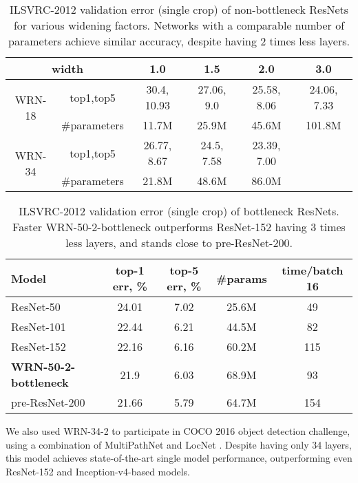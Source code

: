 \documentclass{bmvc2k}
\begin{document}
\begin{table}[ht]
  \centering\small
  \begin{tabular}{c|c|c|c|c|c}
    \hline
\multicolumn{2}{c|}{width} & 1.0 & 1.5 & 2.0 & 3.0 \\ \hline
    \multirow{2}{*}{WRN-18} & top1,top5 & 30.4, 10.93 & 27.06, 9.0 & 25.58, 8.06 & 24.06, 7.33 \\
    & \#parameters & 11.7M & 25.9M & 45.6M & 101.8M \\
    \hline
    \multirow{2}{*}{WRN-34} & top1,top5 & 26.77, 8.67 & 24.5, 7.58 & 23.39, 7.00 &  \\
    & \#parameters & 21.8M & 48.6M & 86.0M \\
    \hline
  \end{tabular}
  \caption{ILSVRC-2012 validation error (single crop) of non-bottleneck ResNets for various widening factors. Networks with a comparable number of parameters achieve similar accuracy, despite having 2 times less layers.}
  \label{table:imagenet_non_bottleneck}
\end{table}

\begin{table}[ht]
  \centering\small
  \begin{tabular}{l|c|c|c|c}
    \hline
    Model & top-1 err, \% & top-5 err, \% & \#params & time/batch 16 \\ \hline
    ResNet-50 & 24.01 & 7.02 & 25.6M & 49 \\
    ResNet-101 & 22.44 & 6.21 & 44.5M & 82 \\
    ResNet-152 & 22.16 & 6.16 & 60.2M & 115 \\
    \bf{WRN-50-2-bottleneck} & 21.9 & 6.03 & 68.9M & 93 \\
    pre-ResNet-200 & 21.66 & 5.79 & 64.7M & 154 \\
    \hline
  \end{tabular}
  \caption{ILSVRC-2012 validation error (single crop) of bottleneck ResNets. Faster WRN-50-2-bottleneck outperforms ResNet-152 having 3 times less layers, and stands close to pre-ResNet-200.}
  \label{table:imagenet_bottleneck}
\end{table}

We also used WRN-34-2 to participate in COCO 2016 object detection challenge, using a combination of MultiPathNet \cite{Zagoruyko2016Multipath} and LocNet \cite{gidaris2016locnet}. Despite having only 34 layers, this model achieves state-of-the-art single model performance, outperforming even ResNet-152 and Inception-v4-based models. 
\end{document}
